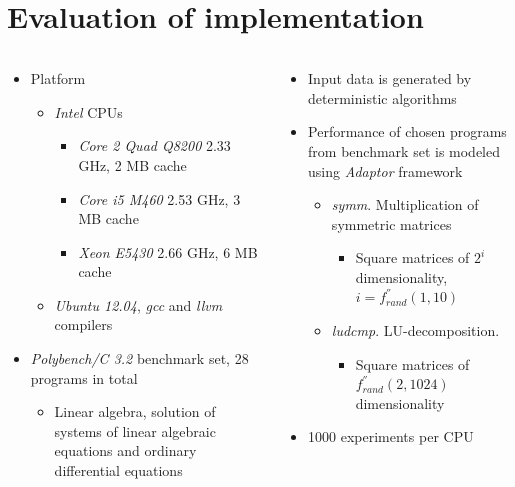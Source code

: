\documentclass{beamer}
\begin{document}
\section{Evaluation of implementation}
	\begin{columns}
		\begin{column}{0.5\textwidth}
			\begin{itemize}
				\item Platform
				\begin{itemize}
					\item \textit{Intel} CPUs
					\begin{itemize}
						\item \textit{Core 2 Quad Q8200} 2.33 GHz, 2 MB cache
						\item \textit{Core i5 M460} 2.53 GHz, 3 MB cache
						\item \textit{Xeon E5430} 2.66 GHz, 6 MB cache
					\end{itemize}
					\item \textit{Ubuntu 12.04}, \textit{gcc} and \textit{llvm} compilers
				\end{itemize}

				\item \textit{Polybench/C 3.2} benchmark set, 28 programs in total
				\begin{itemize}
					\item Linear algebra, solution of systems of linear algebraic equations and ordinary differential equations
				\end{itemize}
			\end{itemize}
		\end{column}
		\begin{column}{0.5\textwidth}
			\begin{itemize}
				\item Input data is generated by deterministic algorithms
				\item Performance of chosen programs from benchmark set is modeled using \textit{Adaptor} framework
				\begin{itemize}
					\item \textit{symm}. Multiplication of symmetric matrices
					\begin{itemize}
						\item Square matrices of $2^i$ dimensionality, $i = f^{''}_{rand}(1,10)$
					\end{itemize}

					\item \textit{ludcmp}. LU-decomposition.
					\begin{itemize}
						\item Square matrices of $f^{''}_{rand}(2,1024)$ dimensionality
					\end{itemize}
				\end{itemize}

				\item 1000 experiments per CPU
			\end{itemize}
		\end{column}
	\end{columns}
\end{document}
